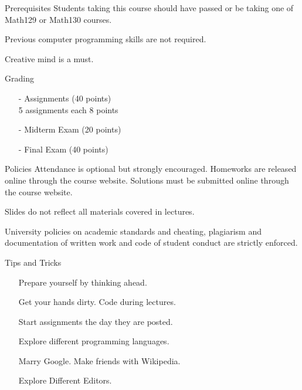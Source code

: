 \documentclass[10pt, compress]{beamer}
\begin{document}
\begin{slide}
	\begin{block}{Prerequisites}
		Students taking this course should have passed or be taking one of Math129 or Math130 courses.

		Previous computer programming skills are not required.

		Creative mind is a must.
	\end{block}
\end{slide}

\begin{slide}
	\begin{block}{Grading}
		\begin{itemize}
			\item[-] Assignments (40 points)\\5 assignments each 8 points
			\item[-] Midterm Exam (20 points)
			\item[-] Final Exam (40 points)
		\end{itemize}
	\end{block}
\end{slide}

\begin{slide}
	\begin{block}{Policies}
		Attendance is optional but strongly encouraged. Homeworks are released online through the course website. Solutions must be submitted online through the course website.

		Slides do not reflect all materials covered in lectures.

		University policies on academic standards and cheating, plagiarism and documentation of written work and code of student conduct are strictly enforced.
	\end{block}
\end{slide}

\begin{slide}
	\begin{block}{Tips and Tricks}
		\begin{itemize}
			\item[] Prepare yourself by thinking ahead.
			\item[] Get your hands dirty. Code during lectures.
			\item[] Start assignments the day they are posted.
			\item[] Explore different programming languages.
			\item[] Marry Google. Make friends with Wikipedia.
			\item[] Explore Different Editors.
		\end{itemize}
	\end{block}
\end{slide}

\end{document}
